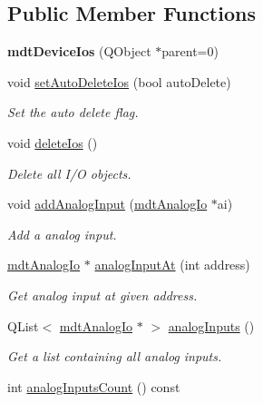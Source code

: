 \subsection*{Public Member Functions}
\begin{DoxyCompactItemize}
\item 
\hypertarget{classmdt_device_ios_a44939a10d66421069bdd4b8717e2798c}{
{\bfseries mdtDeviceIos} (QObject $\ast$parent=0)}
\label{classmdt_device_ios_a44939a10d66421069bdd4b8717e2798c}

\item 
void \hyperlink{classmdt_device_ios_af771f8080ce4a7260baa0acccacae0e1}{setAutoDeleteIos} (bool autoDelete)
\begin{DoxyCompactList}\small\item\em Set the auto delete flag. \end{DoxyCompactList}\item 
void \hyperlink{classmdt_device_ios_a272fc1fa86e1b66e6af0e58b130939e0}{deleteIos} ()
\begin{DoxyCompactList}\small\item\em Delete all I/O objects. \end{DoxyCompactList}\item 
void \hyperlink{classmdt_device_ios_a0e2683630eff9410003a36ae5af76b52}{addAnalogInput} (\hyperlink{classmdt_analog_io}{mdtAnalogIo} $\ast$ai)
\begin{DoxyCompactList}\small\item\em Add a analog input. \end{DoxyCompactList}\item 
\hyperlink{classmdt_analog_io}{mdtAnalogIo} $\ast$ \hyperlink{classmdt_device_ios_a70a3d979ec5d44297e8195e37596d5bc}{analogInputAt} (int address)
\begin{DoxyCompactList}\small\item\em Get analog input at given address. \end{DoxyCompactList}\item 
\hypertarget{classmdt_device_ios_a8635bcc71baa140b87be9edb41e5e61b}{
QList$<$ \hyperlink{classmdt_analog_io}{mdtAnalogIo} $\ast$ $>$ \hyperlink{classmdt_device_ios_a8635bcc71baa140b87be9edb41e5e61b}{analogInputs} ()}
\label{classmdt_device_ios_a8635bcc71baa140b87be9edb41e5e61b}

\begin{DoxyCompactList}\small\item\em Get a list containing all analog inputs. \end{DoxyCompactList}\item 
\hypertarget{classmdt_device_ios_a904069e2e641c92291226ea2524eadb3}{
int \hyperlink{classmdt_device_ios_a904069e2e641c92291226ea2524eadb3}{analogInputsCount} () const }
\label{classmdt_device_ios_a904069e2e641c92291226ea2524eadb3}


\end{DoxyCompactItemize}
